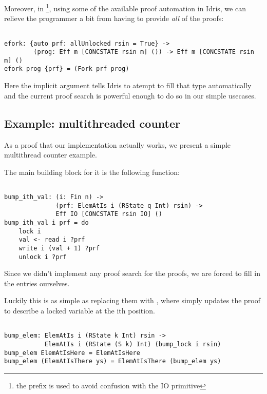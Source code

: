 Moreover, in \footnote{the  prefix is used to avoid
confusion with the IO primitive }, using some of the available proof
automation in Idris, we can relieve the programmer a bit from having to provide
\emph{all} of the proofs:

\begin{BVerbatim}

efork: {auto prf: allUnlocked rsin = True} ->
        (prog: Eff m [CONCSTATE rsin m] ()) -> Eff m [CONCSTATE rsin m] ()
efork prog {prf} = (Fork prf prog)

\end{BVerbatim}

Here the implicit argument  tells Idris to atempt to
fill that type automatically and the current proof search is powerful enough to
do so in our simple usecases.

\subsection{Example: multithreaded counter}

As a proof that our implementation actually works, we present a simple
multithread counter example.

The main building block for it is the following function:

\begin{BVerbatim}

bump_ith_val: (i: Fin n) ->
              (prf: ElemAtIs i (RState q Int) rsin) ->
              Eff IO [CONCSTATE rsin IO] ()
bump_ith_val i prf = do
    lock i
    val <- read i ?prf
    write i (val + 1) ?prf
    unlock i ?prf

\end{BVerbatim}

Since we didn't implement any proof search for the  proofs,
we are forced to fill in the  entries ourselves.

Luckily this is as simple as replacing them with ,
where  simply updates the  proof to describe
a locked variable at the ith position.

\begin{BVerbatim}

bump_elem: ElemAtIs i (RState k Int) rsin ->
           ElemAtIs i (RState (S k) Int) (bump_lock i rsin)
bump_elem ElemAtIsHere = ElemAtIsHere
bump_elem (ElemAtIsThere ys) = ElemAtIsThere (bump_elem ys)

\end{BVerbatim}

